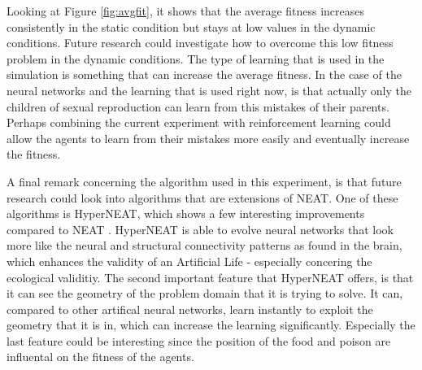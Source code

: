 Looking at Figure \ref{fig:avgfit}, it shows that the average fitness increases consistently in the static condition but stays at low values in the dynamic conditions.
Future research could investigate how to overcome this low fitness problem in the dynamic conditions.
The type of learning that is used in the simulation is something that can increase the average fitness.
In the case of the neural networks and the learning that is used right now, is that actually only the children of sexual reproduction can learn from this mistakes of their parents.
Perhaps combining the current experiment with reinforcement learning could allow the agents to learn from their mistakes more easily and eventually increase the fitness. %

A final remark concerning the algorithm used in this experiment, is that future research could look into algorithms that are extensions of NEAT.
One of these algorithms is HyperNEAT, which shows a few interesting improvements compared to NEAT \cite{stanleyhypercube}.
HyperNEAT is able to evolve neural networks that look more like the neural and structural connectivity patterns as found in the brain, which enhances the validity of an Artificial Life - especially concering the ecological validitiy.
The second important feature that HyperNEAT offers, is that it can see the geometry of the problem domain that it is trying to solve.
It can, compared to other artifical neural networks, learn instantly to exploit the geometry that it is in, which can increase the learning significantly.
Especially the last feature could be interesting since the position of the food and poison are influental on the fitness of the agents.